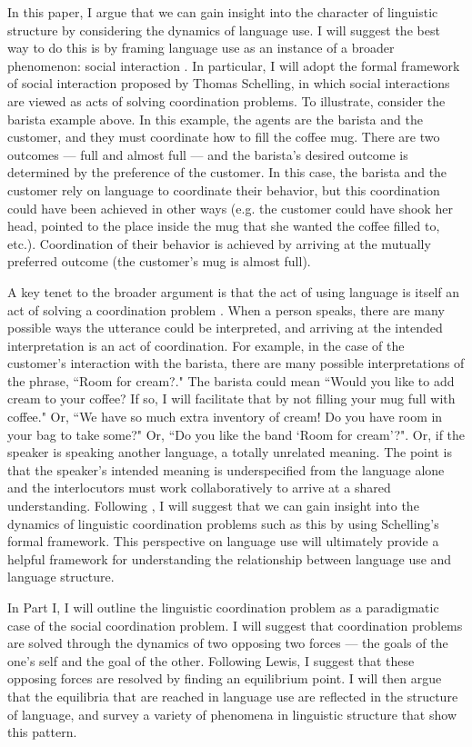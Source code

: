 \documentclass[man, noapacite, 12pt]{apa2}
\begin{document}
In this paper, I argue that we can gain  insight into the character of linguistic structure by considering the dynamics of language use. I will suggest the best way to do this is by framing language use as an instance of a broader phenomenon: social interaction \cite{clark1996using}. In particular, I will adopt the formal framework of social interaction proposed by Thomas Schelling, in which social interactions are viewed as acts of solving coordination problems.  To illustrate, consider the barista example above. In this example, the agents are the barista and the customer, and they must coordinate how  to fill the coffee mug. There are two outcomes --- full and almost full --- and the barista's desired outcome is determined by the preference of the customer. In this case, the barista and the customer rely on language to coordinate their behavior, but this coordination could have been achieved in other ways (e.g. the customer could have shook her head, pointed to the place inside the mug that she wanted the coffee filled to, etc.). Coordination of their behavior is achieved  by arriving at the mutually preferred outcome (the customer's mug is almost full).

A key tenet to the broader argument is that the act of using language is itself an act of solving a coordination problem \cite{clark1996using}. When a person speaks, there are many possible ways the utterance could be interpreted, and arriving at the intended interpretation is an act of coordination. For example, in the case of the customer's interaction with the barista, there are many possible interpretations of the phrase, ``Room for cream?." The barista could mean ``Would you like to add cream to your coffee? If so, I will facilitate that by not filling your mug full with coffee." Or, ``We have so much extra inventory of cream! Do you have room in your bag to take some?" Or, ``Do you like the band `Room for cream'?". Or, if the speaker is speaking another language, a totally unrelated meaning. The point is that the speaker's intended meaning is underspecified from the language alone and the interlocutors must work collaboratively to arrive at a shared understanding. Following , I will suggest that we can gain insight into the dynamics of linguistic coordination problems such as this by using Schelling's formal framework.  This perspective on language use will ultimately provide a helpful framework for understanding the relationship between language use and language structure.

In Part I, I will outline the linguistic coordination problem as a paradigmatic case of the social coordination problem. I will suggest that coordination problems are solved through the dynamics of two opposing two forces --- the goals of the one's self and the goal of the other. Following Lewis, I suggest that these opposing forces are resolved by finding an equilibrium point. I will then argue that the equilibria that are reached in language use are reflected in the structure of language, and survey a variety of phenomena in linguistic structure that show this pattern.
\end{document}
